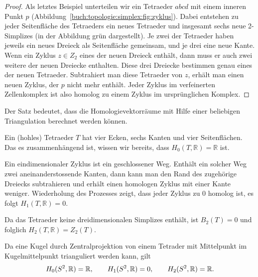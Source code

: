 \begin{proof}
Als letztes Beispiel unterteilen wir ein Tetraeder $abcd$ mit
einem inneren Punkt $p$ (Abbildung~\ref{buch:topologie:simplex:fig:zyklus}).
%
Dabei entstehen zu jeder Seitenfläche des Tetraeders ein neues 
Tetraeder und insgesamt sechs neue 2-Simplizes (in der Abbildung
grün dargestellt).
Je zwei der Tetraeder haben jeweils ein neues Dreieck als Seitenfläche
gemeinsam, und je drei eine neue Kante.
Wenn ein Zyklus $z\in Z_2$ eines der neuen Dreieck enthält, dann
muss er auch zwei weitere der neuen Dreiecke enthalten.
Diese drei Dreiecke bestimmen genau eines der neuen Tetraeder.
Subtrahiert man diese Tetraeder von $z$, erhält man einen neuen
Zyklus, der $p$ nicht mehr enthält.
Jeder Zyklus im verfeinerten Zellenkomplex ist also homolog
zu einem Zyklus im ursprünglichen Komplex.
\end{proof}

Der Satz bedeutet, dass die Homologievektorräume mit Hilfe einer
beliebigen Triangulation berechnet werden können.

\begin{beispiel}
\label{buch:topologie:euler:beispiel:tetraeder}
Ein (hohles) Tetraeder $T$ hat vier Ecken, sechs Kanten und vier Seitenflächen.
Das es zusammenhängend ist, wissen wir bereits, dass
$H_0(T,\mathbb{R})=\mathbb{R}$ ist.

Ein eindimensionaler Zyklus ist ein geschlossener Weg.
Enthält ein solcher Weg zwei aneinanderstossende Kanten, dann kann
man den Rand des zugehörige Dreiecks subtrahieren und erhält
einen homologen Zyklus mit einer Kante weniger.
Wiederholung des Prozesses zeigt, dass jeder Zyklus zu 0 homolog
ist, es folgt $H_1(T,\mathbb{R})=0$.

Da das Tetraeder keine dreidimensionalen Simplizes enthält, ist 
$B_2(T)=0$ und folglich $H_2(T,\mathbb{R})=Z_2(T)$.
\end{beispiel}

\begin{beispiel}
\label{buch:topologie:euler:beispiel:kugel}
Da eine Kugel durch Zentralprojektion von einem Tetrader mit
Mittelpunkt im Kugelmittelpunkt trianguliert werden kann, gilt
\[
H_0(S^2,\mathbb{R}) = \mathbb{R},\qquad
H_1(S^2,\mathbb{R}) = 0,\qquad
H_2(S^2,\mathbb{R}) = \mathbb{R}.
\qedhere
\]
\end{beispiel}

%

